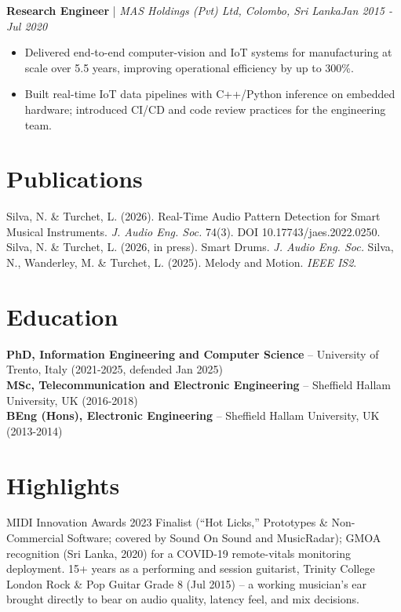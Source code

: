 \documentclass[11pt]{article}
\newenvironment{cvrole}[5]{%
  \par\noindent\textbf{\large #1} | \textit{\small #2, #3}\hfill \textit{\small #4 - #5}\par
  \begin{itemize}[leftmargin=2em, itemsep=-0.3em, topsep=-0.5em]%
}{%
  \end{itemize}\par\noindent\mbox{}\par\vspace{0.1em}%
}
\begin{document}
\begin{cvrole}{Research Engineer}{MAS Holdings (Pvt) Ltd}{Colombo, Sri Lanka}{Jan 2015}{Jul 2020}
\item Delivered end-to-end computer-vision and IoT systems for manufacturing at scale over 5.5 years, improving operational efficiency by up to 300\%.
\item Built real-time IoT data pipelines with C++/Python inference on embedded hardware; introduced CI/CD and code review practices for the engineering team.
\end{cvrole}

\section*{Publications}
Silva, N. \& Turchet, L. (2026). Real-Time Audio Pattern Detection for Smart Musical Instruments. \textit{J. Audio Eng. Soc.} 74(3). DOI 10.17743/jaes.2022.0250. Silva, N. \& Turchet, L. (2026, in press). Smart Drums. \textit{J. Audio Eng. Soc.} Silva, N., Wanderley, M. \& Turchet, L. (2025). Melody and Motion. \textit{IEEE IS2}.

\section*{Education}
\textbf{PhD, Information Engineering and Computer Science} -- University of Trento, Italy (2021-2025, defended Jan 2025) \\
\textbf{MSc, Telecommunication and Electronic Engineering} -- Sheffield Hallam University, UK (2016-2018) \\
\textbf{BEng (Hons), Electronic Engineering} -- Sheffield Hallam University, UK (2013-2014)

\section*{Highlights}
MIDI Innovation Awards 2023 Finalist (``Hot Licks,'' Prototypes \& Non-Commercial Software; covered by Sound On Sound and MusicRadar); GMOA recognition (Sri Lanka, 2020) for a COVID-19 remote-vitals monitoring deployment. 15+ years as a performing and session guitarist, Trinity College London Rock \& Pop Guitar Grade 8 (Jul 2015) -- a working musician's ear brought directly to bear on audio quality, latency feel, and mix decisions.
\end{document}
